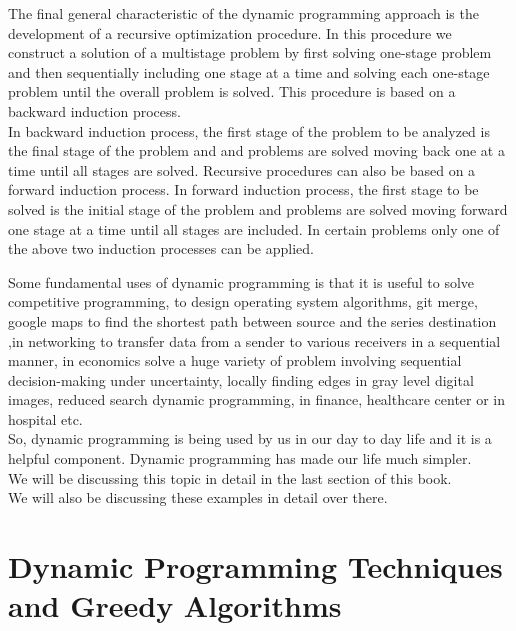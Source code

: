 \documentclass[12pt]{book}
\begin{document}
		The final general characteristic of the dynamic programming approach is the development of a recursive optimization procedure. In this procedure we construct a solution of a multistage problem by first solving one-stage problem and then sequentially including one stage at a time and solving each one-stage problem until the overall problem is solved. This procedure is based on a backward induction process.\\
In backward induction process, the first stage of the problem to be analyzed is the final stage of the problem and and problems are solved moving back one at a time until all stages are solved. Recursive procedures can also be based on a forward induction process. In forward induction process, the first stage to be solved is the initial stage of the problem and problems are solved moving forward one stage at a time until all stages are included. In certain problems only one of the above two induction processes can be applied.

		Some fundamental uses of dynamic programming is that it is useful to solve competitive programming, to design operating system algorithms, git merge, google maps to find the shortest path between source and the series destination ,in networking to transfer data from a sender to various receivers in a sequential manner, in economics solve a huge variety of problem involving sequential decision-making under uncertainty, locally finding edges in gray level digital images, reduced search dynamic programming, in finance, healthcare center or in hospital etc.\\
So, dynamic programming is being used by us in our day to day life and it is a helpful component. Dynamic programming has made our life much simpler.\\

We will be discussing this topic in detail in the last section of this book.\\
We will also be discussing these examples in detail over there.

\part{\textbf{Dynamic Programming Techniques and Greedy Algorithms}}
\end{document}
